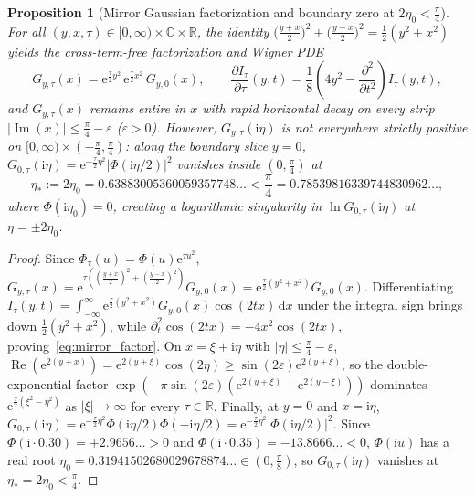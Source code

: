\documentclass[11pt,reqno]{amsart}
\theoremstyle{plain}
\newtheorem{proposition}[theorem]{Proposition}
\theoremstyle{definition}
\theoremstyle{remark}
\numberwithin{equation}{section}
\newcommand{\dd}{\,\mathrm{d}}
\newcommand{\ii}{\mathrm{i}}
\newcommand{\ee}{\mathrm{e}}
\DeclareMathOperator{\Reop}{Re}
\DeclareMathOperator{\Imop}{Im}
\begin{document}
\begin{proposition}[Mirror Gaussian factorization and boundary zero at $2\eta_0 < \frac{\pi}{4}$]\label{prop:wigner_factor}
For all $(y,x,\tau) \in [0,\infty) \times \mathbb{C} \times \mathbb{R}$, the identity $\bigl(\frac{y+x}{2}\bigr)^2 + \bigl(\frac{y-x}{2}\bigr)^2 = \frac{1}{2}(y^2 + x^2)$ yields the cross-term-free factorization and Wigner PDE
\begin{equation}\label{eq:mirror_factor}
G_{y,\tau}(x) = \ee^{\frac{\tau}{2}y^2}\,\ee^{\frac{\tau}{2}x^2}\,G_{y,0}(x), \qquad \frac{\partial I_\tau}{\partial\tau}(y,t) = \frac{1}{8}\left(4y^2 - \frac{\partial^2}{\partial t^2}\right)I_\tau(y,t),
\end{equation}
and $G_{y,\tau}(x)$ remains entire in $x$ with rapid horizontal decay on every strip $\lvert\Imop(x)\rvert \le \frac{\pi}{4} - \varepsilon$ ($\varepsilon > 0$). However, $G_{y,\tau}(\ii\eta)$ is \emph{not} everywhere strictly positive on $[0,\infty) \times (-\frac{\pi}{4}, \frac{\pi}{4})$: along the boundary slice $y = 0$, $G_{0,\tau}(\ii\eta) = \ee^{-\frac{\tau}{2}\eta^2}\lvert\Phi(\ii\eta/2)\rvert^2$ vanishes inside $(0, \frac{\pi}{4})$ at
\begin{equation}\label{eq:two_eta0_root}
\eta_* := 2\eta_0 = 0.63883005360059357748\dots < \frac{\pi}{4} = 0.78539816339744830962\dots,
\end{equation}
where $\Phi(\ii\eta_0) = 0$, creating a logarithmic singularity in $\ln G_{0,\tau}(\ii\eta)$ at $\eta = \pm 2\eta_0$.
\end{proposition}

\begin{proof}
Since $\Phi_\tau(u) = \Phi(u)\ee^{\tau u^2}$, $G_{y,\tau}(x) = \ee^{\tau((\frac{y+x}{2})^2 + (\frac{y-x}{2})^2)}G_{y,0}(x) = \ee^{\frac{\tau}{2}(y^2+x^2)}G_{y,0}(x)$. Differentiating $I_\tau(y,t) = \int_{-\infty}^\infty \ee^{\frac{\tau}{2}(y^2+x^2)}G_{y,0}(x)\cos(2tx)\dd x$ under the integral sign brings down $\frac{1}{2}(y^2 + x^2)$, while $\partial_t^2\cos(2tx) = -4x^2\cos(2tx)$, proving~\eqref{eq:mirror_factor}. On $x = \xi + \ii\eta$ with $\lvert\eta\rvert \le \frac{\pi}{4} - \varepsilon$, $\Reop(\ee^{2(y\pm x)}) = \ee^{2(y\pm\xi)}\cos(2\eta) \ge \sin(2\varepsilon)\ee^{2(y\pm\xi)}$, so the double-exponential factor $\exp(-\pi\sin(2\varepsilon)(\ee^{2(y+\xi)} + \ee^{2(y-\xi)}))$ dominates $\ee^{\frac{\tau}{2}(\xi^2 - \eta^2)}$ as $\lvert\xi\rvert \to \infty$ for every $\tau \in \mathbb{R}$. Finally, at $y = 0$ and $x = \ii\eta$, $G_{0,\tau}(\ii\eta) = \ee^{-\frac{\tau}{2}\eta^2}\Phi(\ii\eta/2)\Phi(-\ii\eta/2) = \ee^{-\frac{\tau}{2}\eta^2}\lvert\Phi(\ii\eta/2)\rvert^2$. Since $\Phi(\ii\cdot 0.30) = +2.9656\dots > 0$ and $\Phi(\ii\cdot 0.35) = -13.8666\dots < 0$, $\Phi(\ii u)$ has a real root $\eta_0 = 0.31941502680029678874\dots \in (0, \frac{\pi}{8})$, so $G_{0,\tau}(\ii\eta)$ vanishes at $\eta_* = 2\eta_0 < \frac{\pi}{4}$.
\end{proof}
\end{document}
